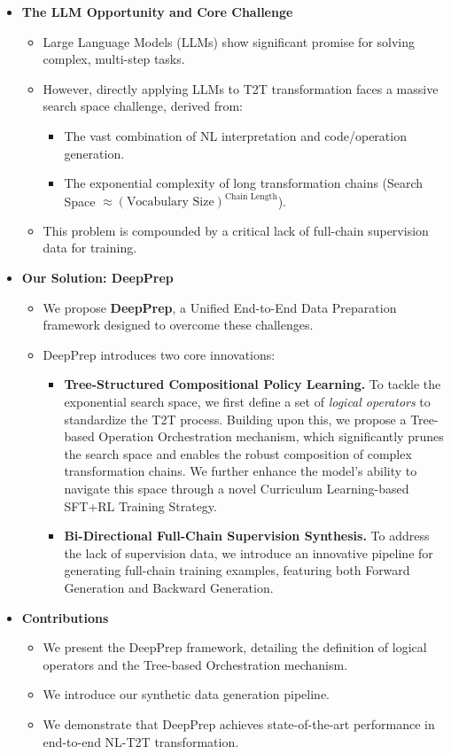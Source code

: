 \begin{itemize}
    \item \textbf{The LLM Opportunity and Core Challenge}
    \begin{itemize}
        \item Large Language Models (LLMs) show significant promise for solving complex, multi-step tasks.
        \item However, directly applying LLMs to T2T transformation faces a massive search space challenge, derived from:
        \begin{itemize}
            \item The vast combination of NL interpretation and code/operation generation.
            \item The exponential complexity of long transformation chains (Search Space $\approx (\text{Vocabulary Size})^{\text{Chain Length}}$).
        \end{itemize}
        \item This problem is compounded by a critical lack of full-chain supervision data for training.
    \end{itemize}

    \item \textbf{Our Solution: DeepPrep}
    \begin{itemize}
        \item We propose \textbf{DeepPrep}, a Unified End-to-End Data Preparation framework designed to overcome these challenges.
        \item DeepPrep introduces two core innovations:
        \begin{itemize}
            \item \textbf{Tree-Structured Compositional Policy Learning.} To tackle the exponential search space, we first define a set of \textit{logical operators} to standardize the T2T process. Building upon this, we propose a {Tree-based Operation Orchestration} mechanism, which significantly prunes the search space and enables the robust composition of complex transformation chains. We further enhance the model's ability to navigate this space through a novel {Curriculum Learning-based SFT+RL Training Strategy}.
            \item \textbf{Bi-Directional Full-Chain Supervision Synthesis.} To address the lack of supervision data, we introduce an innovative pipeline for generating full-chain training examples, featuring both {Forward Generation} and {Backward Generation}.
        \end{itemize}
    \end{itemize}

    \item \textbf{Contributions}
    \begin{itemize}
        \item We present the DeepPrep framework, detailing the definition of logical operators and the Tree-based Orchestration mechanism.
        \item We introduce our synthetic data generation pipeline.
        \item We demonstrate that DeepPrep achieves state-of-the-art performance in end-to-end NL-\nlwhat T2T transformation.
    \end{itemize}
\end{itemize}
